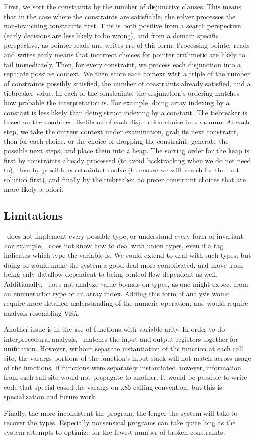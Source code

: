 First, we sort the constraints by the number of disjunctive clauses. This means that in the case where the constraints are satisfiable, the solver processes the non-branching constraints first. This is both positive from a search perspective (early decisions are less likely to be wrong), and from a domain specific perspective, as pointer reads and writes are of this form. Processing pointer reads and writes early means that incorrect choices for pointer arithmetic are likely to fail immediately.
Then, for every constraint, we process each disjunction into a separate possible context. We then score each context with a triple of the number of constraints possibly satisfied, the number of constraints already satisfied, and a tiebreaker value.
In each of the constraints, the disjunction's ordering matches how probable the interpretation is. For example, doing array indexing by a constant is less likely than doing struct indexing by a constant. The tiebreaker is based on the combined likelihood of each disjunction choice in a vacuum. At each step, we take the current context under examination, grab its next constraint, then for each choice, or the choice of dropping the constraint, generate the possible next steps, and place them into a heap. The sorting order for the heap is first by constraints already processed (to avoid backtracking when we do not need to), then by possible constraints to solve (to ensure we will search for the best solution first), and finally by the tiebreaker, to prefer constraint choices that are more likely a priori.

\subsection{Limitations}
\bitr\ does not implement every possible type, or understand every form of invariant. For example, \bitr\ does not know how to deal with union types, even if a tag indicates which type the variable is. We could extend to deal with such types, but doing so would make the system a good deal more complicated, and move from being only dataflow dependent to being control flow dependent as well. Additionally, \bitr\ does not analyze value bounds on types, as one might expect from an enumeration type or an array index. Adding this form of analysis would require more detailed understanding of the numeric operation, and would require analysis resembling VSA\cite{vsa}.

Another issue is in the use of functions with variable arity. In order to do interprocedural analysis, \bitr\ matches the input and output registers together for unification. However, without separate instantiation of the function at each call site, the varargs portions of the function's input stack will not match across usage of the functions. If functions were separately instantiated however, information from each call site would not propagate to another. It would be possible to write code that special cased the varargs on x86 calling convention, but this is specialization and future work.

Finally, the more inconsistent the program, the longer the system will take to recover the types. Especially nonsensical programs can take quite long as the system attempts to optimize for the fewest number of broken constraints.
